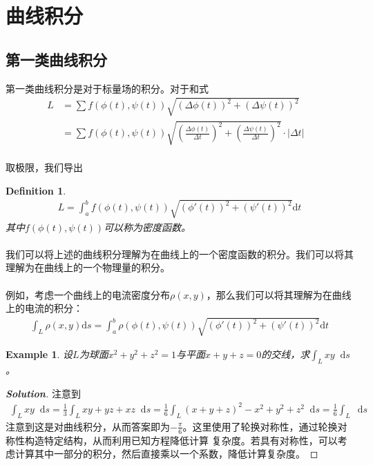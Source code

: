 \documentclass[12pt,a4paper,UTF8]{ctexbook}
\theoremstyle{plain}
\newtheorem{definition}{\indent Definition}[section]
\newtheorem{example}{\indent Example}[section]
\newenvironment{solution}{\begin{proof}[\indent\bf Solution]}{\end{proof}}
\newcommand{\diff}{\mathop{}\!\mathrm{d}} %
\begin{document}
\section{曲线积分}
\subsection{第一类曲线积分}
第一类曲线积分是对于标量场的积分。对于和式
\begin{align*}
    L&=\sum f(\phi(t),\psi(t))\sqrt{(\Delta \phi(t))^2+(\Delta \psi(t))^2}&\\
     &=\sum f(\phi(t),\psi(t))\sqrt{(\frac{\Delta \phi(t)}{\Delta t})^2+(\frac{\Delta \psi(t)}{\Delta t})^2}\cdot|\Delta t|&
\end{align*}
\paragraph{}取极限，我们导出
\begin{definition}
\begin{align*}
    L=\int_{a}^{b}f(\phi(t),\psi(t))\sqrt{(\phi'(t))^2+(\psi'(t))^2}\mathrm d t
\end{align*}
其中$f(\phi(t),\psi(t))$可以称为密度函数。
\end{definition}
\paragraph{}我们可以将上述的曲线积分理解为在曲线上的一个密度函数的积分。我们可以将其理解为在曲线上的一个物理量的积分。
\paragraph{}例如，考虑一个曲线上的电流密度分布$\rho(x,y)$，那么我们可以将其理解为在曲线上的电流的积分：
\begin{align*}
    \int_{L}\rho(x,y)\mathrm d s=\int_{a}^{b}\rho(\phi(t),\psi(t))\sqrt{(\phi'(t))^2+(\psi'(t))^2}\mathrm d t
\end{align*}
\begin{example} 
    设$L$为球面$x^2+y^2+z^2=1$与平面$x+y+z=0$的交线，求$\int_{L}xy\diff s$。
\end{example}
\begin{solution}
        注意到
        \begin{align*}
        \int_L xy \diff s= \frac{1}{3}\int_{L}xy+yz+xz\diff s=\frac{1}{6}\int_{L}(x+y+z)^2-x^2+y^2+z^2\diff s=\frac{1}{6}\int_L \diff s
        \end{align*}
        注意到这是对曲线积分，从而答案即为$-\frac{\pi}{6}$。这里使用了轮换对称性，通过轮换对称性构造特定结构，从而利用已知方程降低计算
        复杂度。若具有对称性，可以考虑计算其中一部分的积分，然后直接乘以一个系数，降低计算复杂度。
    \end{solution}
\end{document}
